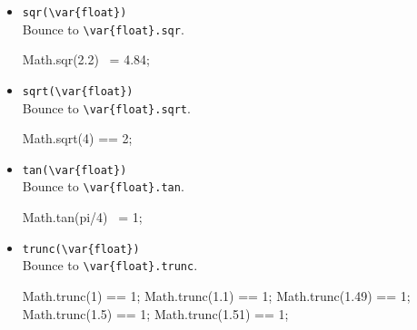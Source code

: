 \begin{itemize}
\item \lstinline|sqr(\var{float})|\\
  Bounce to \lstinline|\var{float}.sqr|.
\begin{urbiassert}[firstnumber=last]
Math.sqr(2.2) ~= 4.84;
\end{urbiassert}

\item \lstinline|sqrt(\var{float})|\\
  Bounce to \lstinline|\var{float}.sqrt|.
\begin{urbiassert}[firstnumber=last]
Math.sqrt(4) == 2;
\end{urbiassert}

\item \lstinline|tan(\var{float})|\\
  Bounce to \lstinline|\var{float}.tan|.
\begin{urbiassert}[firstnumber=last]
Math.tan(pi/4) ~= 1;
\end{urbiassert}

\item \lstinline|trunc(\var{float})|\\
  Bounce to \lstinline|\var{float}.trunc|.
\begin{urbiassert}[firstnumber=last]
Math.trunc(1) == 1;
Math.trunc(1.1) == 1;
Math.trunc(1.49) == 1;
Math.trunc(1.5) == 1;
Math.trunc(1.51) == 1;
\end{urbiassert}
\end{itemize}


